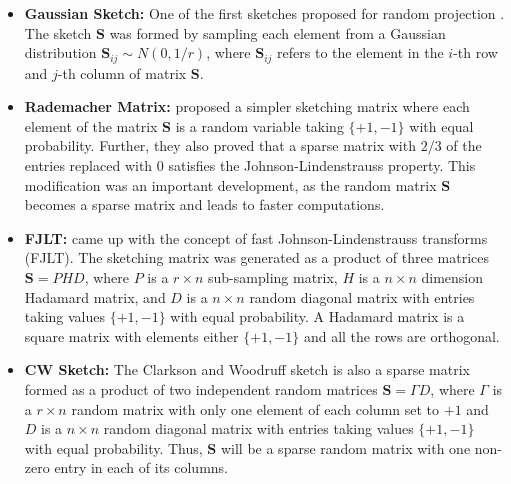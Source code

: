 \begin{itemize}


\item \textbf{Gaussian Sketch:} One of the first sketches proposed for random projection \cite{sarlos_improved_2006}. The sketch $\textbf{S}$ was formed by sampling each element from a Gaussian distribution $\textbf{S}_{ij} \sim N(0, 1/r)$, where $\textbf{S}_{ij}$ refers to the element in the $i$-th row and $j$-th column of matrix $\textbf{S}$.\\

\item \textbf{Rademacher Matrix:} \cite{achlioptas_fast_2007} proposed a simpler sketching matrix where each element of the matrix $\textbf{S}$ is a random variable taking $\{+1, -1\}$ with equal probability. Further, they also proved that a sparse matrix with $2/3$ of the entries replaced with 0 satisfies the Johnson-Lindenstrauss property.  This modification was an  important development, as the random matrix $\textbf{S}$ becomes a sparse matrix and leads to faster computations. \\

\item \textbf{FJLT:}  \cite{ailon_fast_2009} came up with the concept of fast Johnson-Lindenstrauss transforms (FJLT). The sketching matrix was generated as a product of three matrices $\textbf{S} = PHD$, where $P$ is a $r \times n$ sub-sampling matrix, $H$ is  a $n \times n$ dimension Hadamard matrix, and $D$ is a $n \times n$  random  diagonal matrix with entries taking values $\{+1, -1\}$ with equal probability. A Hadamard matrix is a square matrix with elements either $\{+1, -1\}$ and all the rows are orthogonal. \\

\item \textbf{CW Sketch:} The Clarkson and Woodruff sketch \cite{clarkson_low-rank_2017} is also a sparse matrix formed as a product of two independent random matrices $\textbf{S} = \Gamma D$, where $\Gamma$ is a $r \times n$ random matrix with only one element of each column set to $+1$ and $D$ is a $n \times n$ random diagonal matrix with entries taking values $\{+1, -1\}$ with equal probability. Thus,  $\textbf{S}$ will be a sparse random matrix with one non-zero entry in each of its columns. 
\end{itemize}

